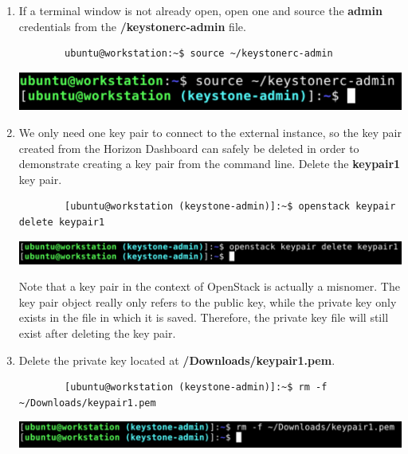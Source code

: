 \documentclass[letterpaper, 12pt]{article}
\begin{document}
\begin{enumerate}
    \item If a terminal window is not already open, open one and source the \textbf{admin} credentials from the
    \textbf{\texttildemid/keystonerc-admin} file.
    \begin{lstlisting}
        ubuntu@workstation:~$ source ~/keystonerc-admin
    \end{lstlisting}

    \begin{center}
        \includegraphics[width=\linewidth]{images/part4/step4.png}
    \end{center}

    \item We only need one key pair to connect to the external instance, so the key pair created from the Horizon
    Dashboard can safely be deleted in order to demonstrate creating a key pair from the command line. Delete the
    \textbf{keypair1} key pair.
    \begin{lstlisting}
        [ubuntu@workstation (keystone-admin)]:~$ openstack keypair delete keypair1
    \end{lstlisting}

    \begin{center}
        \includegraphics[width=\linewidth]{images/part4/step5.png}
    \end{center}

    \begin{notebox}
        Note that a key pair in the context of OpenStack is actually a misnomer. The key pair object really only refers
        to the public key, while the private key only exists in the file in which it is saved. Therefore, the private
        key file will still exist after deleting the key pair.
    \end{notebox}

    \item Delete the private key located at \textbf{\texttildemid/Downloads/keypair1.pem}.
    \begin{lstlisting}
        [ubuntu@workstation (keystone-admin)]:~$ rm -f ~/Downloads/keypair1.pem
    \end{lstlisting}

    \begin{center}
        \includegraphics[width=\linewidth]{images/part4/step6.png}
    \end{center}


\end{enumerate}
\end{document}
